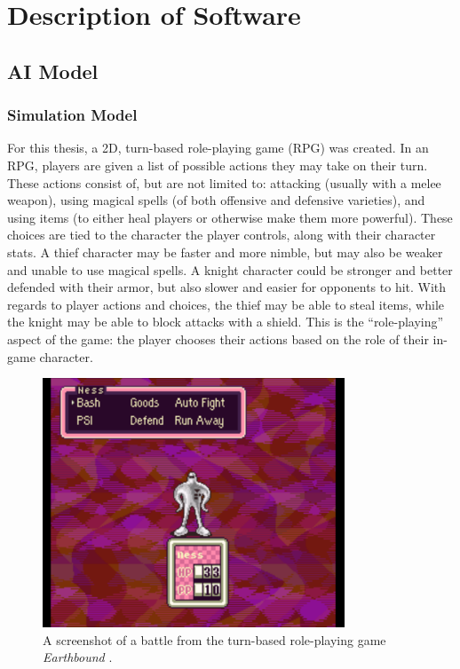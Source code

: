 \chapter{Description of Software}
\section{AI Model}
\subsection{Simulation Model}
For this thesis, a 2D, turn-based role-playing game (RPG) was created. In an RPG, players are given a list of possible actions they may take on their turn. These actions consist of, but are not limited to: attacking (usually with a melee weapon), using magical spells (of both offensive and defensive varieties), and using items (to either heal players or otherwise make them more powerful). These choices are tied to the character the player controls, along with their character stats. A thief character may be faster and more nimble, but may also be weaker and unable to use magical spells. A knight character could be stronger and better defended with their armor, but also slower and easier for opponents to hit. With regards to player actions and choices, the thief may be able to steal items, while the knight may be able to block attacks with a shield. This is the ``role-playing'' aspect of the game: the player chooses their actions based on the role of their in-game character.\\

\begin{figure}[H]
  \centering
  \includegraphics[width=9cm]{figures/Earthbound.png}
  \caption{A screenshot of a battle from the turn-based role-playing game \textit{Earthbound} \cite{earthbound94}.}
  \label{fig:Earthbound}
\end{figure}

